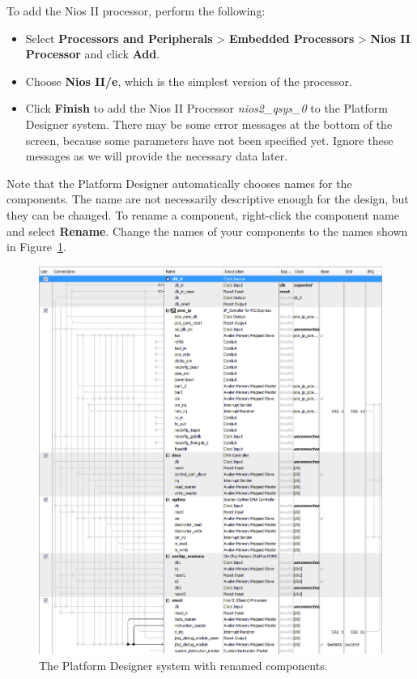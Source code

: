\documentclass[11pt, twoside, pdftex]{article}
\begin{document}
To add the Nios II processor, perform the following:

\begin{itemize}
	\item Select {\bf Processors and Peripherals} > {\bf Embedded Processors} > {\bf Nios II Processor} and click {\bf Add}.
	\item Choose {\bf Nios II/e}, which is the simplest version of the processor.
	\item Click {\bf Finish} to add the Nios II Processor {\it nios2\_qsys\_0} to the Platform Designer system. There may be some error messages at the bottom of the screen, because some parameters have not been specified yet. Ignore these messages as we will provide the necessary data later. 
\end{itemize}

\newpage
Note that the Platform Designer automatically chooses names for the components. The name are not necessarily descriptive enough for the design, but they can be changed. To rename a component, right-click the component name and select {\bf Rename}. Change the names of your components to the names shown in Figure~\ref{fig:qsys_system_renamed}.

\begin{figure}[H]
	\centering
	  \includegraphics[scale=0.53]{figures/qsys_system_renamed.png}
	\caption{The Platform Designer system with renamed components.} 
	\label{fig:qsys_system_renamed}
\end{figure}
\end{document}
